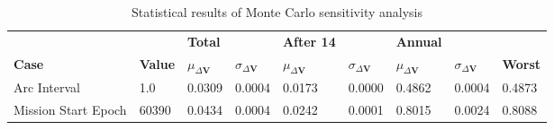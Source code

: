 \begin{table}[h!]
\centering
\begin{tabular}{lllllllll}
 &  & \cellcolor[HTML]{EFEFEF}\textbf{Total} &  & \cellcolor[HTML]{EFEFEF}\textbf{After 14} & & \cellcolor[HTML]{EFEFEF}\textbf{Annual} & &\\
\rowcolor[HTML]{EFEFEF} 
\textbf{Case} & \textbf{Value} & \textbf{$\mu_{\Delta \boldsymbol{V}}$} & \textbf{$\sigma_{\Delta \boldsymbol{V}}$} & \textbf{$\mu_{\Delta \boldsymbol{V}}$} & \textbf{$\sigma_{\Delta \boldsymbol{V}}$} & \textbf{$\mu_{\Delta \boldsymbol{V}}$} & \textbf{$\sigma_{\Delta \boldsymbol{V}}$} & \textbf{Worst} \\ 
Arc Interval & 1.0 & 0.0309 & 0.0004 & 0.0173 & 0.0000 & 0.4862 & 0.0004 & 0.4873 \\ 
Mission Start Epoch & 60390 & 0.0434 & 0.0004 & 0.0242 & 0.0001 & 0.8015 & 0.0024 & 0.8088 \\ 
\end{tabular}
\caption{Statistical results of Monte Carlo sensitivity analysis}
\label{tab:SensitivityAnalysis}
\end{table}